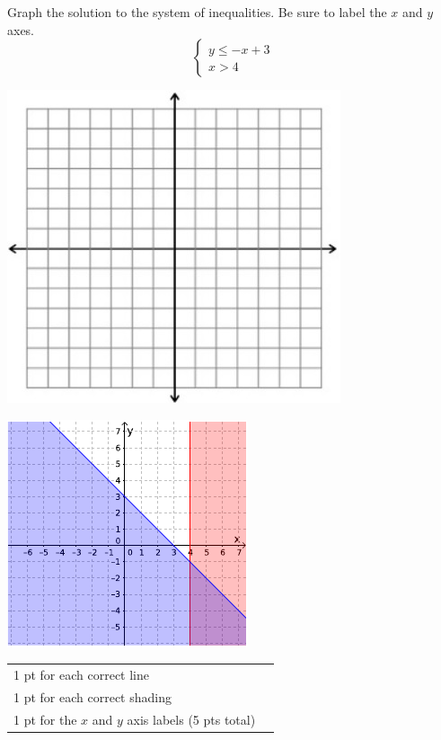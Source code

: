 {
	Graph the solution to the system of inequalities. Be sure to label the $x$ and $y$ axes. $$\begin{cases}y\leq -x+3 \\ x>4 \end{cases}$$\begin{onlyproblem}\begin{center}\includegraphics{fig-graphpaper.png}\end{center}\end{onlyproblem} \begin{onlysolution}\begin{center}\includegraphics{fig095-12-5-d-answer}\end{center}\end{onlysolution}
	
}
{
	\begin{tabular}{l r}
	1 pt for each correct line\\
	1 pt for each correct shading\\
	1 pt for the $x$ and $y$ axis labels (5 pts total)\\
	\end{tabular}
}
